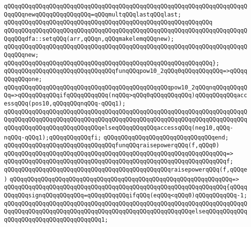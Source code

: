 \verb|qQQqqQQqqQQqqQQqqQQqqQQqqQQqqQQqqQQqqQQqqQQqqQQqqQQqqQQqqQQqqQQqqQQqqQQqqQQqnewqQQqqQQqqQQqqQQq=qQQqmultqQQqlastqQQqlast;|\newline
\verb|qQQqqQQqqQQqqQQqqQQqqQQqqQQqqQQqqQQqqQQqqQQqqQQqqQQqqQQqqQQq|\newline
\verb|qQQqqQQqqQQqqQQqqQQqqQQqqQQqqQQqqQQqqQQqqQQqqQQqqQQqqQQqqQQqqQQqqQQqqQQqqQQqdfa::setqQQq(arr,qQQqn,qQQqmakelemqQQqnew);|\newline
\newline
\verb|qQQqqQQqqQQqqQQqqQQqqQQqqQQqqQQqqQQqqQQqqQQqqQQqqQQqqQQqqQQqqQQqqQQqqQQqqQQqnew;|\newline
\verb|qQQqqQQqqQQqqQQqqQQqqQQqqQQqqQQqqQQqqQQqqQQqqQQqqQQqqQQqqQQq};|\newline
\newline
\verb|qQQqqQQqqQQqqQQqqQQqqQQqqQQqqQQqfunqQQqpow10_2qQQq0qQQqqQQqqQQq=>qQQqqQQqqQQqone;|\newline
\verb|qQQqqQQqqQQqqQQqqQQqqQQqqQQqqQQqqQQqqQQqqQQqqQQqpow10_2qQQqnqQQqqQQqqQQq=>qQQqqQQqqQQqifqQQqqQQqqQQq(nqQQq>qQQq0qQQqqQQqqQQq)qQQqqQQqqQQqaccessqQQq(pos10,qQQqqQQqnqQQq-qQQq1);|\newline
\verb|qQQqqQQqqQQqqQQqqQQqqQQqqQQqqQQqqQQqqQQqqQQqqQQqqQQqqQQqqQQqqQQqqQQqqQQqqQQqqQQqqQQqqQQqqQQqqQQqqQQqqQQqqQQqqQQqqQQqqQQqqQQqqQQqqQQqqQQqqQQqqQQqqQQqqQQqqQQqqQQqqQQqqQQqelseqQQqqQQqqQQqaccessqQQq(neg10,qQQq-nqQQq-qQQq1);qQQqqQQqqQQqfi;|\newline
\verb|qQQqqQQqqQQqqQQqqQQqqQQqqQQqqQQqend;|\newline
\newline
\verb|qQQqqQQqqQQqqQQqqQQqqQQqqQQqqQQqfunqQQqraisepowerqQQq(f,qQQq0)|\newline
\verb|qQQqqQQqqQQqqQQqqQQqqQQqqQQqqQQqqQQqqQQqqQQqqQQqqQQqqQQqqQQqqQQq=>|\newline
\verb|qQQqqQQqqQQqqQQqqQQqqQQqqQQqqQQqqQQqqQQqqQQqqQQqqQQqqQQqqQQqqQQqf;|\newline
\newline
\verb|qQQqqQQqqQQqqQQqqQQqqQQqqQQqqQQqqQQqqQQqqQQqqQQqraisepowerqQQq(f,qQQqe)|\newline
\verb|qQQqqQQqqQQqqQQqqQQqqQQqqQQqqQQqqQQqqQQqqQQqqQQqqQQqqQQqqQQqqQQq=>|\newline
\verb|qQQqqQQqqQQqqQQqqQQqqQQqqQQqqQQqqQQqqQQqqQQqqQQqqQQqqQQqqQQqqQQq{qQQqqQQqqQQqsignqQQqqQQqqQQq=qQQqqQQqqQQqifqQQq(eqQQq<qQQq0)qQQqqQQqqQQq-1;|\newline
\verb|qQQqqQQqqQQqqQQqqQQqqQQqqQQqqQQqqQQqqQQqqQQqqQQqqQQqqQQqqQQqqQQqqQQqqQQqqQQqqQQqqQQqqQQqqQQqqQQqqQQqqQQqqQQqqQQqqQQqqQQqqQQqelseqQQqqQQqqQQqqQQqqQQqqQQqqQQqqQQqqQQqqQQq1;|\newline

